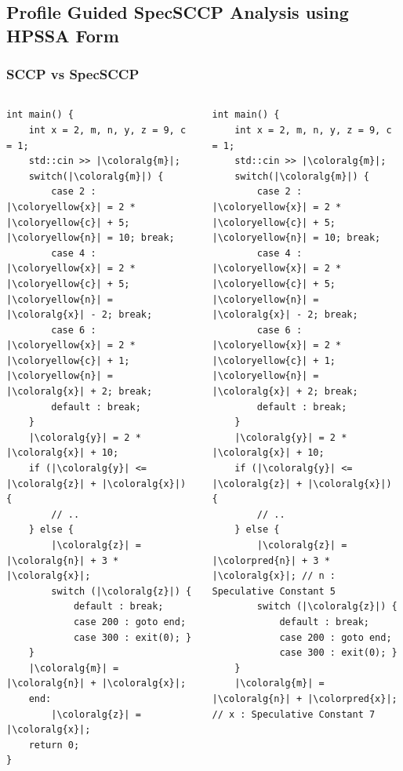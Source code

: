 \documentclass[aspectratio=169, compress]{beamer}
\newcommand{\colorpred}[1]{\colorbox{green}{#1}}
\newcommand{\coloralg}[1]{\colorbox{pink}{#1}}
\newcommand{\coloryellow}[1]{\colorbox{yellow}{#1}}
\begin{document}
\subsection{Profile Guided SpecSCCP Analysis using HPSSA Form}
\begin{frame}[fragile]
	\frametitle{SCCP vs SpecSCCP}
	\begin{columns}
		\begin{column}{0.4\textwidth}
			\begin{verbatim}
int main() {
	int x = 2, m, n, y, z = 9, c = 1;
	std::cin >> |\coloralg{m}|;
	switch(|\coloralg{m}|) {   
		case 2 : |\coloryellow{x}| = 2 * |\coloryellow{c}| + 5; |\coloryellow{n}| = 10; break;
		case 4 : |\coloryellow{x}| = 2 * |\coloryellow{c}| + 5; |\coloryellow{n}| = |\coloralg{x}| - 2; break;
		case 6 : |\coloryellow{x}| = 2 * |\coloryellow{c}| + 1; |\coloryellow{n}| = |\coloralg{x}| + 2; break;
		default : break;
	}
	|\coloralg{y}| = 2 * |\coloralg{x}| + 10;
	if (|\coloralg{y}| <= |\coloralg{z}| + |\coloralg{x}|) {
		// ..
	} else {
		|\coloralg{z}| = |\coloralg{n}| + 3 * |\coloralg{x}|;
		switch (|\coloralg{z}|) {
			default : break;
			case 200 : goto end;
			case 300 : exit(0); }
	}
	|\coloralg{m}| = |\coloralg{n}| + |\coloralg{x}|;  
	end:
		|\coloralg{z}| = |\coloralg{x}|;
	return 0;
}
			\end{verbatim}
		\end{column}
		\begin{column}{0.4\textwidth}
			\begin{verbatim}
int main() {
	int x = 2, m, n, y, z = 9, c = 1;
	std::cin >> |\coloralg{m}|;
	switch(|\coloralg{m}|) {   
		case 2 : |\coloryellow{x}| = 2 * |\coloryellow{c}| + 5; |\coloryellow{n}| = 10; break;
		case 4 : |\coloryellow{x}| = 2 * |\coloryellow{c}| + 5; |\coloryellow{n}| = |\coloralg{x}| - 2; break;
		case 6 : |\coloryellow{x}| = 2 * |\coloryellow{c}| + 1; |\coloryellow{n}| = |\coloralg{x}| + 2; break;
		default : break;
	}
	|\coloralg{y}| = 2 * |\coloralg{x}| + 10;
	if (|\coloralg{y}| <= |\coloralg{z}| + |\coloralg{x}|) {
		// ..
	} else {
		|\coloralg{z}| = |\colorpred{n}| + 3 * |\coloralg{x}|; // n : Speculative Constant 5
		switch (|\coloralg{z}|) {
			default : break;
			case 200 : goto end;
			case 300 : exit(0); }
	}
	|\coloralg{m}| = |\coloralg{n}| + |\colorpred{x}|;  // x : Speculative Constant 7

\end{verbatim}
\end{column}
\end{columns}
\end{frame}
\end{document}
